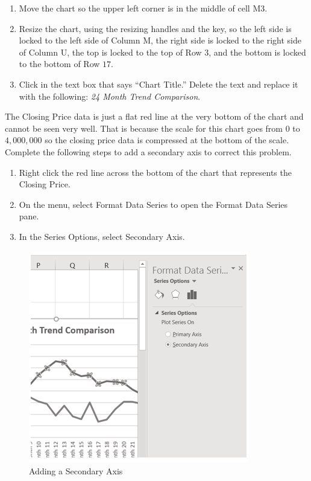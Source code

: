 \begin{enumerate}
	\item Move the chart so the upper left corner is in the middle of cell \textsf{M3}.
	\item Resize the chart, using the resizing handles and the  key, so the left side is locked to the left side of Column M, the right side is locked to the right side of Column U, the top is locked to the top of Row $ 3 $, and the bottom is locked to the bottom of Row $ 17 $.
	\item Click in the text box that says ``Chart Title.'' Delete the text and replace it with the following: \textit{24 Month Trend Comparison}.
\end{enumerate}

The Closing Price data is just a flat red line at the very bottom of the chart and cannot be seen very well. That is because the scale for this chart goes from $ 0 $ to $ 4,000,000 $ so the closing price data is compressed at the bottom of the scale. Complete the following steps to add a secondary axis to correct this problem.

\begin{enumerate}
	\item Right click the red line across the bottom of the chart that represents the Closing Price.
	\item On the menu, select Format Data Series to open the Format Data Series pane.
	\item In the Series Options, select Secondary Axis.
\end{enumerate}

\begin{figure}[H]
	\centering
	\includegraphics[width=\maxwidth{.95\linewidth}]{gfx/ch04_fig08}
	\caption{Adding a Secondary Axis}
	\label{04:fig08}
\end{figure}

